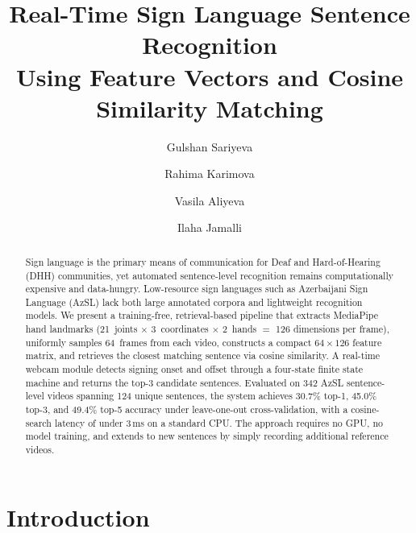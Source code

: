 \documentclass[runningheads]{llncs}
\begin{document}
%
\title{Real-Time Sign Language Sentence Recognition\\
Using Feature Vectors and Cosine Similarity Matching}
%
%
\author{Gulshan Sariyeva \and
Rahima Karimova \and
Vasila Aliyeva \and
Ilaha Jamalli}
%
%
%
\maketitle
%
\begin{abstract}
Sign language is the primary means of communication for Deaf and
Hard-of-Hearing (DHH) communities, yet automated sentence-level
recognition remains computationally expensive and data-hungry.
Low-resource sign languages such as Azerbaijani Sign Language (AzSL)
lack both large annotated corpora and lightweight recognition models.
We present a training-free, retrieval-based pipeline that extracts
MediaPipe hand landmarks (21~joints $\times$ 3~coordinates $\times$ 2~hands
$=$ 126 dimensions per frame), uniformly samples 64~frames from each
video, constructs a compact $64 \times 126$ feature matrix, and
retrieves the closest matching sentence via cosine similarity.
A real-time webcam module detects signing onset and offset through a
four-state finite state machine and returns the top-3 candidate
sentences.
Evaluated on 342 AzSL sentence-level videos spanning 124 unique
sentences, the system achieves 30.7\% top-1, 45.0\% top-3, and
49.4\% top-5 accuracy under leave-one-out cross-validation, with a
cosine-search latency of under 3\,ms on a standard CPU.
The approach requires no GPU, no model training, and extends to new
sentences by simply recording additional reference videos.

\end{abstract}
%
%
\section{Introduction}
\end{document}
